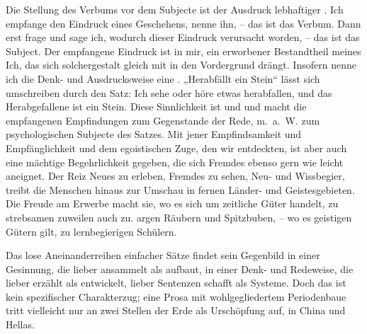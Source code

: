 \largerpage
Die Stellung des Verbums vor dem Subjecte ist der Ausdruck lebhaftiger . Ich empfange den Eindruck eines Geschehens, nenne ihn, – das ist das Verbum. Dann erst frage und sage ich, wodurch dieser Eindruck verursacht worden, – das ist das Subject. Der empfangene Eindruck ist in mir, ein erworbener Bestandtheil meines Ich, das sich solchergestalt gleich mit in den Vordergrund drängt. Insofern nenne ich die Denk- und Ausdrucksweise eine . „Herabfällt ein Stein“ lässt sich umschreiben durch den Satz: Ich sehe oder höre etwas herabfallen, und das Herabgefallene ist ein Stein. Diese Sinnlichkeit ist  und  und macht die em\label{sp.414}pfangenen Empfindungen zum Gegenstande der Rede, m.~a.~W. zum psychologischen Subjecte des Satzes. Mit jener Empfindsamkeit und Empfänglichkeit und dem egoistischen Zuge, den wir entdeckten, ist aber auch eine mächtige Begehrlichkeit gegeben, die sich Fremdes ebenso gern wie leicht aneignet. Der Reiz Neues zu erleben, Fremdes zu sehen, Neu- und Wissbegier, treibt die Menschen hinaus zur Umschau in fernen Länder- und Geistesgebieten. Die Freude am Erwerbe macht sie, wo es sich um zeitliche Güter handelt, zu strebsamen  zuweilen auch zu. argen Räubern und Spitzbuben, – wo es geistigen Gütern gilt, zu lernbegierigen Schülern.

Das lose Aneinanderreihen einfacher Sätze findet sein Gegenbild in einer Gesinnung, die lieber ansammelt als aufbaut, in einer Denk- und Redeweise, die lieber erzählt als entwickelt, lieber Sentenzen schafft als Systeme. Doch das ist kein spezifischer Charakterzug; eine Prosa mit wohlgegliedertem Periodenbaue tritt vielleicht nur an zwei Stellen der Erde als Urschöpfung auf, in China und Hellas.

